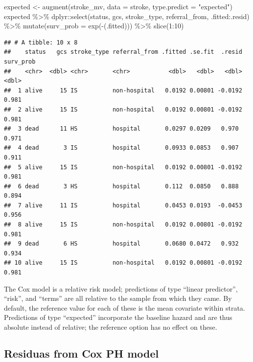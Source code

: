 \documentclass[
  10pt,
]{krantz}
\newenvironment{Shaded}{\begin{snugshade}}{\end{snugshade}}
\newcommand{\AttributeTok}[1]{\textcolor[rgb]{0.77,0.63,0.00}{#1}}
\newcommand{\DecValTok}[1]{\textcolor[rgb]{0.00,0.00,0.81}{#1}}
\newcommand{\FunctionTok}[1]{\textcolor[rgb]{0.00,0.00,0.00}{#1}}
\newcommand{\NormalTok}[1]{#1}
\newcommand{\OtherTok}[1]{\textcolor[rgb]{0.56,0.35,0.01}{#1}}
\newcommand{\SpecialCharTok}[1]{\textcolor[rgb]{0.00,0.00,0.00}{#1}}
\newcommand{\StringTok}[1]{\textcolor[rgb]{0.31,0.60,0.02}{#1}}
\begin{document}
\begin{Shaded}
\begin{Highlighting}[]
\NormalTok{expected }\OtherTok{\textless{}{-}} 
  \FunctionTok{augment}\NormalTok{(stroke\_mv, }
          \AttributeTok{data =}\NormalTok{ stroke, }
          \AttributeTok{type.predict =} \StringTok{"expected"}\NormalTok{)}
\NormalTok{expected }\SpecialCharTok{\%\textgreater{}\%}
\NormalTok{  dplyr}\SpecialCharTok{::}\FunctionTok{select}\NormalTok{(status, gcs, stroke\_type, referral\_from, .fitted}\SpecialCharTok{:}\NormalTok{.resid) }\SpecialCharTok{\%\textgreater{}\%}
  \FunctionTok{mutate}\NormalTok{(}\AttributeTok{surv\_prob =} \FunctionTok{exp}\NormalTok{(}\SpecialCharTok{{-}}\NormalTok{(.fitted))) }\SpecialCharTok{\%\textgreater{}\%}
  \FunctionTok{slice}\NormalTok{(}\DecValTok{1}\SpecialCharTok{:}\DecValTok{10}\NormalTok{)}
\end{Highlighting}
\end{Shaded}

\begin{verbatim}
## # A tibble: 10 x 8
##    status   gcs stroke_type referral_from .fitted .se.fit  .resid surv_prob
##    <chr>  <dbl> <chr>       <chr>           <dbl>   <dbl>   <dbl>     <dbl>
##  1 alive     15 IS          non-hospital   0.0192 0.00801 -0.0192     0.981
##  2 alive     15 IS          non-hospital   0.0192 0.00801 -0.0192     0.981
##  3 dead      11 HS          hospital       0.0297 0.0209   0.970      0.971
##  4 dead       3 IS          hospital       0.0933 0.0853   0.907      0.911
##  5 alive     15 IS          non-hospital   0.0192 0.00801 -0.0192     0.981
##  6 dead       3 HS          hospital       0.112  0.0850   0.888      0.894
##  7 alive     11 IS          hospital       0.0453 0.0193  -0.0453     0.956
##  8 alive     15 IS          non-hospital   0.0192 0.00801 -0.0192     0.981
##  9 dead       6 HS          hospital       0.0680 0.0472   0.932      0.934
## 10 alive     15 IS          non-hospital   0.0192 0.00801 -0.0192     0.981
\end{verbatim}

The Cox model is a relative risk model; predictions of type ``linear predictor'', ``risk'', and ``terms'' are all relative to the sample from which they came. By default, the reference value for each of these is the mean covariate within strata. Predictions of type ``expected'' incorporate the baseline hazard and are thus absolute instead of relative; the reference option has no effect on these.

\hypertarget{residuas-from-cox-ph-model}{%
\subsection{Residuas from Cox PH model}\label{residuas-from-cox-ph-model}}
\end{document}
